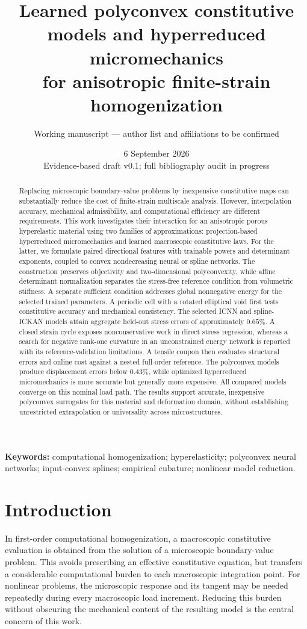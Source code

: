\documentclass[10pt,a4paper]{article}
\title{Learned polyconvex constitutive models and hyperreduced micromechanics\protect\\
for anisotropic finite-strain homogenization}
\author{Working manuscript --- author list and affiliations to be confirmed}
\date{6 September 2026\\\small Evidence-based draft v0.1; full bibliography audit in progress}
\begin{document}
\maketitle
\begin{abstract}
Replacing microscopic boundary-value problems by inexpensive constitutive maps can substantially reduce the cost of finite-strain multiscale analysis. However, interpolation accuracy, mechanical admissibility, and computational efficiency are different requirements. This work investigates their interaction for an anisotropic porous hyperelastic material using two families of approximations: projection-based hyperreduced micromechanics and learned macroscopic constitutive laws. For the latter, we formulate paired directional features with trainable powers and determinant exponents, coupled to convex nondecreasing neural or spline networks. The construction preserves objectivity and two-dimensional polyconvexity, while affine determinant normalization separates the stress-free reference condition from volumetric stiffness. A separate sufficient condition addresses global nonnegative energy for the selected trained parameters. A periodic cell with a rotated elliptical void first tests constitutive accuracy and mechanical consistency. The selected ICNN and spline-ICKAN models attain aggregate held-out stress errors of approximately $0.65\%$. A closed strain cycle exposes nonconservative work in direct stress regression, whereas a search for negative rank-one curvature in an unconstrained energy network is reported with its reference-validation limitations. A tensile coupon then evaluates structural errors and online cost against a nested full-order reference. The polyconvex models produce displacement errors below $0.43\%$, while optimized hyperreduced micromechanics is more accurate but generally more expensive. All compared models converge on this nominal load path. The results support accurate, inexpensive polyconvex surrogates for this material and deformation domain, without establishing unrestricted extrapolation or universality across microstructures.
\end{abstract}
\noindent\textbf{Keywords:} computational homogenization; hyperelasticity; polyconvex neural networks; input-convex splines; empirical cubature; nonlinear model reduction.

\section{Introduction}
\label{sec:intro}
In first-order computational homogenization, a macroscopic constitutive evaluation is obtained from the solution of a microscopic boundary-value problem. This avoids prescribing an effective constitutive equation, but transfers a considerable computational burden to each macroscopic integration point. For nonlinear problems, the microscopic response and its tangent may be needed repeatedly during every macroscopic load increment. Reducing this burden without obscuring the mechanical content of the resulting model is the central concern of this work.
\end{document}
